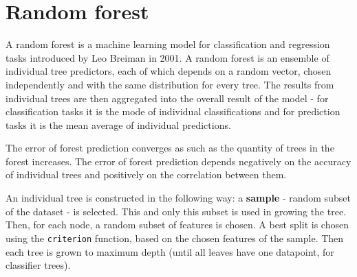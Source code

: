 










\section{Random forest}
A random forest \cite{random_forest} is a machine learning model for classification and regression tasks introduced by Leo Breiman in 2001. A random forest is an ensemble of individual tree predictors, each of which depends on a random vector, chosen independently and with the same distribution for every tree. The results from individual trees are then aggregated into the overall result of the model - for classification tasks it is the mode of individual classifications and for prediction tasks it is the mean average of individual predictions.

The error of forest prediction converges as such as the quantity of trees in the forest increases. The error of forest prediction depends negatively on the accuracy of individual trees and positively on the correlation between them.

An individual tree is constructed in the following way: a \textbf{sample} - random subset of the dataset - is selected. This and only this subset is used in growing the tree.
Then, for each node, a random subset of features is chosen. A best split is chosen using the \verb|criterion| function, based on the chosen features of the sample. Then each tree is grown to maximum depth (until all leaves have one datapoint, for classifier trees).

